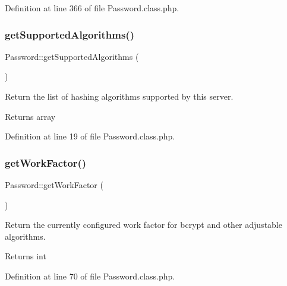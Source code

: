 Definition at line 366 of file Password.\+class.\+php.

\hypertarget{classPassword_a4983366e7b062e052e6d9f716aa3e59c}{}\label{classPassword_a4983366e7b062e052e6d9f716aa3e59c} 
\subsubsection{\texorpdfstring{get\+Supported\+Algorithms()}{getSupportedAlgorithms()}}
{\footnotesize\ttfamily Password\+::get\+Supported\+Algorithms (\begin{DoxyParamCaption}{ }\end{DoxyParamCaption})}



Return the list of hashing algorithms supported by this server. 

\begin{DoxyReturn}{Returns}
array 
\end{DoxyReturn}


Definition at line 19 of file Password.\+class.\+php.

\hypertarget{classPassword_a2c41d8ed7334ffeef9a0b2778b86d8f7}{}\label{classPassword_a2c41d8ed7334ffeef9a0b2778b86d8f7} 
\subsubsection{\texorpdfstring{get\+Work\+Factor()}{getWorkFactor()}}
{\footnotesize\ttfamily Password\+::get\+Work\+Factor (\begin{DoxyParamCaption}{ }\end{DoxyParamCaption})}



Return the currently configured work factor for bcrypt and other adjustable algorithms. 

\begin{DoxyReturn}{Returns}
int 
\end{DoxyReturn}


Definition at line 70 of file Password.\+class.\+php.

\hypertarget{classPassword_a8f65e4dcd66bdf6507db9e09c05d9932}{}\label{classPassword_a8f65e4dcd66bdf6507db9e09c05d9932} 
